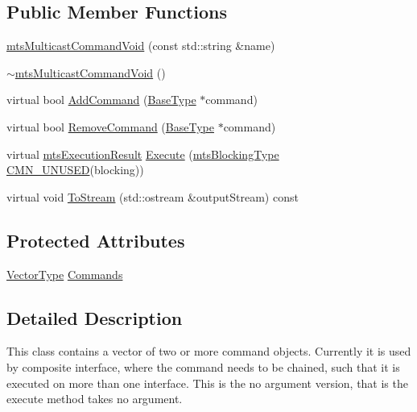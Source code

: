 \subsection*{Public Member Functions}
\begin{DoxyCompactItemize}
\item 
\hyperlink{classmts_multicast_command_void_a0cab0a922e91a5e620e70162f7d3fe65}{mts\+Multicast\+Command\+Void} (const std\+::string \&name)
\item 
\hyperlink{classmts_multicast_command_void_ad96e12608775cabdd603604353cff4a7}{$\sim$mts\+Multicast\+Command\+Void} ()
\item 
virtual bool \hyperlink{classmts_multicast_command_void_a2d04e7d3c12a6a47535540d34c737576}{Add\+Command} (\hyperlink{classmts_command_void_aa0e2be86c520aef7b9c3a59e3cfbbce3}{Base\+Type} $\ast$command)
\item 
virtual bool \hyperlink{classmts_multicast_command_void_a7b9664767999861a6bc08fda5e405e94}{Remove\+Command} (\hyperlink{classmts_command_void_aa0e2be86c520aef7b9c3a59e3cfbbce3}{Base\+Type} $\ast$command)
\item 
virtual \hyperlink{classmts_execution_result}{mts\+Execution\+Result} \hyperlink{classmts_multicast_command_void_a8e00a2156c2aafd723a554e979974b60}{Execute} (\hyperlink{mts_forward_declarations_8h_ad7426ccb6c883bc780d0ee197dddcbe7}{mts\+Blocking\+Type} \hyperlink{cmn_portability_8h_a021894e2626935fa2305434b1e893ff6}{C\+M\+N\+\_\+\+U\+N\+U\+S\+E\+D}(blocking))
\item 
virtual void \hyperlink{classmts_multicast_command_void_a8d3442e9f633665c9e465c351432c82e}{To\+Stream} (std\+::ostream \&output\+Stream) const 
\end{DoxyCompactItemize}
\subsection*{Protected Attributes}
\begin{DoxyCompactItemize}
\item 
\hyperlink{classmts_multicast_command_void_a2d0478105f8fcc377056363ab5aa7fa0}{Vector\+Type} \hyperlink{classmts_multicast_command_void_a71303972432c845838760333033f6226}{Commands}
\end{DoxyCompactItemize}


\subsection{Detailed Description}
This class contains a vector of two or more command objects. Currently it is used by composite interface, where the command needs to be chained, such that it is executed on more than one interface. This is the no argument version, that is the execute method takes no argument. 


